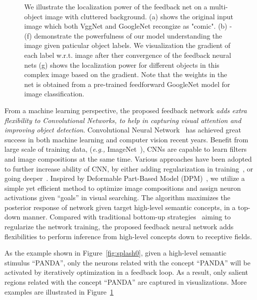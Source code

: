 \begin{figure}[htb]
\begin{center}
\caption{We illustrate the localization power of the feedback net on a multi-object image with cluttered background. (a) shows the original input image which both VggNet and GoogleNet recongize as "comic". (b) - (f) demonstrate the powerfulness of our model understanding the image given paticular object labels. We visualization the gradient of each label w.r.t. image after ther convergence of the feedback neural nets (g) shows the localization power for different objects in this complex image based on the gradient. Note that the weights in the net is obtained from a pre-trained feedforward GoogleNet model for image classification.}
\label{fig:splah}
\end{center}
\end{figure}

From a machine learning perspective, the proposed feedback network \emph{adds extra flexibility to Convolutional Networks, to help in capturing visual attention and improving object detection}. Convolutional Neural Network~\cite{lecun1998gradient, Krizhevsky2012ImageNet, Simonyan2014Very} has achieved great success in both machine learning and computer vision recent years. Benefit from large scale of training data, (\emph{e.g.,} ImageNet~\cite{deng2009imagenet}), CNNs are capable to learn filters and image compositions at the same time. Various approaches have been adopted to further increase ability of CNN, by either adding regularization in training~\cite{he2015delving,ioffe2015batch}, or going deeper~\cite{Simonyan2014Very, Szegedy2014Going}. Inspired by Deformable Part-Based Model (DPM)~\cite{Felzenszwalb2010Object}, we utilize a simple yet efficient method to optimize image compositions and assign neuron activations given ``goals'' in visual searching. The algorithm maximizes the posterior response of network given target high-level semantic concepts, in a top-down manner. Compared with traditional bottom-up strategies~\cite{he2015delving, ioffe2015batch} aiming to regularize the network training, the proposed feedback neural network adds flexibilities to perform inference from high-level concepts down to receptive fields.

As the example shown in Figure~\ref{fig:splash0}, given a high-level semantic stimulus ``PANDA'', only the neurons related with the concept ``PANDA'' will be activated by iteratively optimization in a feedback loop. As a result, only salient regions related with the concept ``PANDA'' are captured in visualizations. More examples are illustrated in Figure~\ref{fig:splah}


